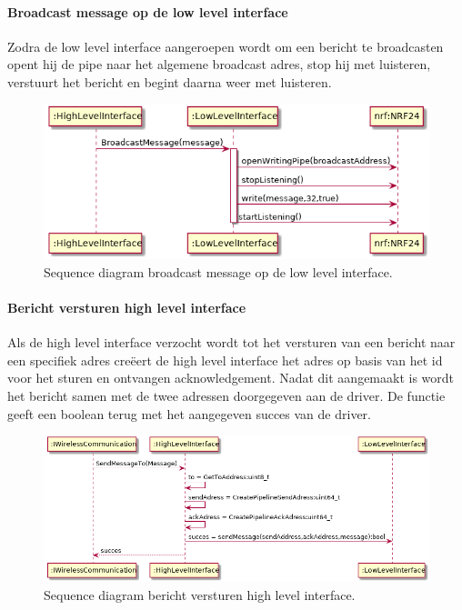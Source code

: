 \documentclass[a4paper, 11pt, oneside]{report}
\begin{document}
\paragraph{Broadcast message op de low level interface}
\label{DetailedDesign:NRF24:sequence:lowlevelBroadcastMessage}
Zodra de low level interface aangeroepen wordt om een bericht te broadcasten opent hij de pipe naar het algemene broadcast adres, stop hij met luisteren, verstuurt het bericht en begint daarna weer met luisteren.
\begin{figure}[H]
	\begin{center}\includegraphics[width=.8\linewidth]{UML/out/NRF24/sequence/lowlevelBroadcastMessage/lowlevelBroadcastMessage.png}\end{center}
	\caption{Sequence diagram broadcast message op de low level interface.}
	\label{fig:NRF24:sequence:lowlevelBroadcastMessage}
\end{figure}

\paragraph{Bericht versturen high level interface }
\label{DetailedDesign:NRF24:sequence:highlevelSendMessage}
Als de high level interface verzocht wordt tot het versturen van een bericht naar een specifiek adres creëert de high level interface het adres op basis van het id voor het sturen en ontvangen acknowledgement. Nadat dit aangemaakt is wordt het bericht samen met de twee adressen doorgegeven aan de driver.
De functie geeft een boolean terug met het aangegeven succes van de driver.
\begin{figure}[H]
	\begin{center}\includegraphics[width=1\linewidth]{UML/out/NRF24/sequence/highlevelSendMessage/highlevelSendMessage.png}\end{center}
	\caption{Sequence diagram bericht versturen high level interface.}
	\label{fig:NRF24:sequence:highlevelSendMessage}
\end{figure}
\end{document}
